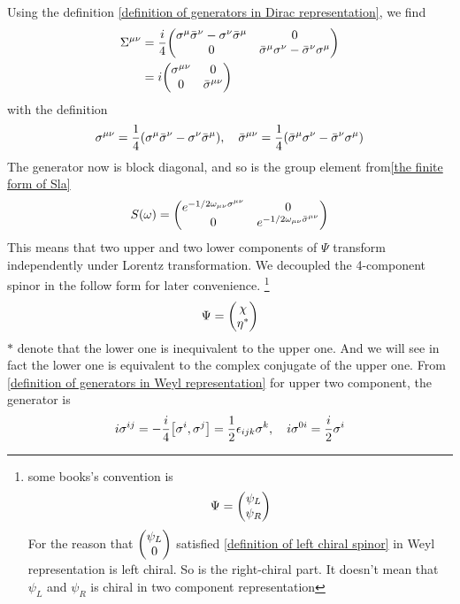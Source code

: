 Using the definition \eqref{definition of generators in Dirac representation}, we find
\begin{align}\label{definition of generators in Weyl representation}
\Si^{\mu\nu}
&= \frac{i}{4}
\mqty(
\s^{\m}\bar{\s}^{\n}-\s^{\n}\bar{\s}^{\m}&
0\\
0&
\bar{\s}^{\m}\s^{\n}-\bar{\s}^{\n}\s^{\m}) \notag\\
& = i \mqty(
\s^{\mu\nu}&
0\\
0&
\bar{\s}^{\mu\nu})
\end{align}
with the definition
\begin{equation}
  \sigma^{\mu\nu} =\frac{1}{4}(\sigma^{\mu}\bar{\sigma}^{\nu}-\sigma^{\nu}\bar{\sigma}^{\mu}),\quad
\bar{\sigma}^{\mu\nu}
=\frac{1}{4}(\bar{\sigma}^{\mu}\sigma^{\nu}-\bar{\sigma}^{\nu}\sigma^{\mu})
\end{equation}
The generator now is block diagonal, and so is the group element from\eqref{the finite form of Sla}
\begin{equation} \label{group element for weyl representation}
S(\w) = \mqty(
e^{-1/2\w_{\mu\nu}\s^{\mu\nu}} &
0                           \\
0                           &
e^{-1/2\w_{\mu\nu}\bar{\s}^{\mu\nu}})
\end{equation}
This means that two upper and two lower components of $\Psi$  transform independently under Lorentz transformation. We decoupled the 4-component spinor in the follow form for later convenience.
\footnote{
  some books's convention is
  \begin{equation}
     \Psi = \mqty(\admat{\psi_L \\ \psi_R})
  \end{equation}
  For the reason that $\mqty(\admat{\psi_L \\ 0})$ satisfied \eqref{definition of left chiral spinor} in Weyl representation is left chiral. So is the right-chiral part. It doesn't mean that $\psi_L$ and $\psi_R$ is chiral in two component representation
  }
\begin{equation}\label{decouple of Weyl representation}
  \Psi = \mqty(\admat{\chi \\ \h^*})
\end{equation}
$*$ denote that the lower one is inequivalent to the upper one. And we will see in fact the lower one is equivalent to the complex conjugate of the upper one.
From \eqref{definition of generators in Weyl representation} for upper two component, the generator is
\begin{equation} \label{the generator for  two component}
i\s^{ij} = -\frac{i}{4}\comm{\s^{i}}{\s^{j}} = \half\e_{ijk} \s^k ,\quad
i\s^{0i} = \frac{i}{2}\s^{i}
\end{equation}
